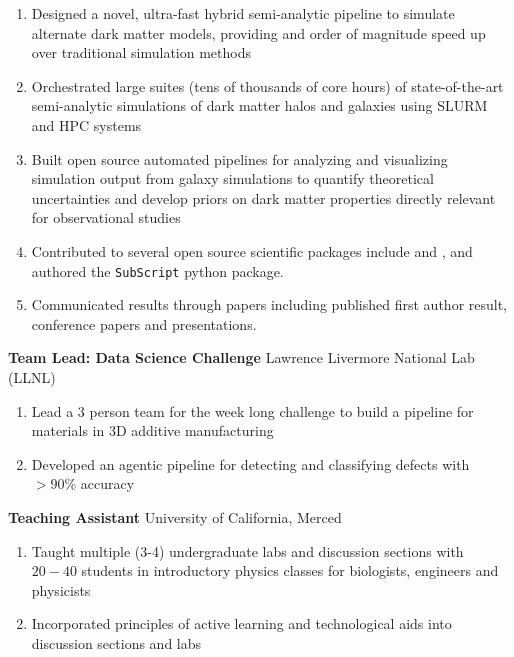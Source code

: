 \begin{vitapage}
\begin{jobs}
\begin{enumerate}
      \item Designed a novel, ultra-fast hybrid semi-analytic pipeline to simulate alternate dark matter models, providing and order of magnitude speed up over traditional simulation methods
      \item Orchestrated large suites (tens of thousands of core hours) of state-of-the-art semi-analytic simulations of dark matter halos and galaxies using SLURM and HPC systems
      \item Built open source automated pipelines for analyzing and visualizing simulation output from galaxy simulations to quantify theoretical uncertainties and develop priors on dark matter properties directly relevant for observational studies
      \item Contributed to several open source scientific packages include \gal and \pyh, and authored the {\tt SubScript} python package.
      \item Communicated results through papers including published first author result, conference papers and presentations.
  \end{enumerate}
 \item \textbf{Team Lead: Data Science Challenge} Lawrence Livermore National Lab (LLNL)
  \begin{enumerate} 
      \item Lead a 3 person team for the week long challenge to build a pipeline for materials in 3D additive manufacturing 
      \item Developed an agentic pipeline for detecting and classifying defects with $> 90 \%$ accuracy
  \end{enumerate}
  \item \textbf{Teaching Assistant} University of California, Merced
  \begin{enumerate}
      \item Taught multiple (3-4) undergraduate labs and discussion sections with $20-40$ students in introductory physics classes for biologists, engineers and physicists
      \item Incorporated principles of active learning and technological aids into discussion sections and labs
  \end{enumerate}
  
\end{jobs}




\end{vitapage}
